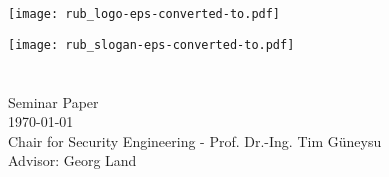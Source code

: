 
\begin{titlepage}
    \enlargethispage{3cm}
    \vspace*{-32mm}\hspace*{120mm}
    \texttt{[image: rub\_logo-eps-converted-to.pdf]}
    
    \vspace*{11cm}\hspace*{0mm}
    \begin{minipage}[b]{1\linewidth}
        \sffamily
        \hspace{-17.2mm}\texttt{[image: rub\_slogan-eps-converted-to.pdf]}\\
        
        \nohyphens{
            {\bfseries \LARGE \sffamily {\thtitle}}
        }\\
        
        \large{
            \thauthor
        }\\
        
        \vspace*{35mm}
        \normalsize{
            Seminar Paper\\
            \today\\
            Chair for Security Engineering - Prof. Dr.-Ing. Tim G{\"u}neysu\\
            Advisor: Georg Land
        }
    \end{minipage}
\end{titlepage}
